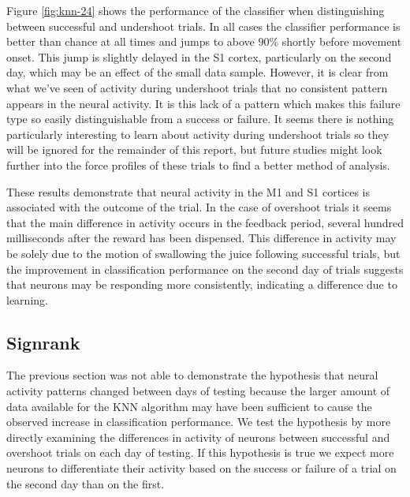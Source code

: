 \documentclass[11pt,a4paper]{article}
\begin{document}
Figure \ref{fig:knn-24} shows the performance of the classifier when distinguishing between successful and undershoot trials. In all cases the classifier performance is better than chance at all times and jumps to above $90\%$ shortly before movement onset. This jump is slightly delayed in the S1 cortex, particularly on the second day, which may be an effect of the small data sample. However, it is clear from what we've seen of activity during undershoot trials that no consistent pattern appears in the neural activity. It is this lack of a pattern which makes this failure type so easily distinguishable from a success or failure. It seems there is nothing particularly interesting to learn about activity during undershoot trials so they will be ignored for the remainder of this report, but future studies might look further into the force profiles of these trials to find a better method of analysis.

These results demonstrate that neural activity in the M1 and S1 cortices is associated with the outcome of the trial. In the case of overshoot trials it seems that the main difference in activity occurs in the feedback period, several hundred milliseconds after the reward has been dispensed. This difference in activity may be solely due to the motion of swallowing the juice following successful trials, but the improvement in classification performance on the second day of trials suggests that neurons may be responding more consistently, indicating a difference due to learning. 


\subsection{Signrank}

The previous section was not able to demonstrate the hypothesis that neural activity patterns changed between days of testing because the larger amount of data available for the KNN algorithm may have been sufficient to cause the observed increase in classification performance. We test the hypothesis by more directly examining the differences in activity of neurons between successful and overshoot trials on each day of testing. If this hypothesis is true we expect more neurons to differentiate their activity based on the success or failure of a trial on the second day than on the first.
\end{document}
